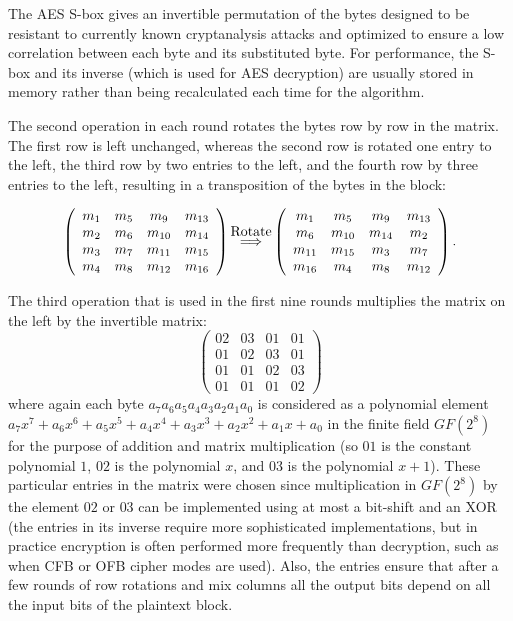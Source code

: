 The AES S-box gives an invertible permutation of the bytes designed to be
resistant to currently known cryptanalysis attacks and optimized to
ensure a low correlation between each byte and its substituted byte.
For performance, the S-box and its inverse (which is used for AES decryption)
are usually stored in memory rather than being recalculated each time
for the algorithm.

The second operation in each round rotates the bytes row by row in
the matrix. The first row is left unchanged, whereas the second row is rotated
one entry to the left, the third row by two entries to the left,
and the fourth row by three entries to the left, resulting in a transposition
of the bytes in the block:

\begin{displaymath}
  \left(\begin{array}{cccc}
    m_1 & m_5 & m_9    & m_{13} \\
    m_2 & m_6 & m_{10} & m_{14} \\
    m_3 & m_7 & m_{11} & m_{15} \\
    m_4 & m_8 & m_{12} & m_{16}
  \end{array}\right)
  \hfill \shortstack{Rotate\\ $\Longrightarrow$} \hfill
  \left(\begin{array}{cccc}
    m_1    & m_5    & m_9    & m_{13} \\
    m_6    & m_{10} & m_{14} & m_2 \\
    m_{11} & m_{15} & m_3    & m_7 \\
    m_{16} & m_4    & m_8    & m_{12}
  \end{array}\right).
\end{displaymath}

The third operation that is used in the first nine rounds multiplies
the matrix on the left by the invertible matrix:
\begin{displaymath}
  \left(\begin{array}{cccc}
    02 & 03 & 01 & 01 \\
    01 & 02 & 03 & 01 \\
    01 & 01 & 02 & 03 \\
    01 & 01 & 01 & 02
  \end{array}\right)
\end{displaymath}
where again each byte $a_7a_6a_5a_4a_3a_2a_1a_0$
is considered as a polynomial element
$a_7x^7+a_6x^6+a_5x^5+a_4x^4+a_3x^3+a_2x^2+a_1x+a_0$
in the finite field $GF(2^8)$ for the purpose of addition and
matrix multiplication (so $01$ is the constant polynomial $1$,
$02$ is the polynomial $x$, and $03$ is the polynomial $x+1$).
These particular entries in the matrix were chosen since
multiplication in $GF(2^8)$ by the element $02$ or $03$
can be implemented using at most a bit-shift and an XOR
(the entries in its inverse require more sophisticated
implementations, but in practice encryption is often performed more frequently
than decryption, such as when CFB or OFB cipher modes are used).
Also, the entries ensure that after a few rounds of row rotations and mix columns
all the output bits depend on all the input bits of the plaintext block.

